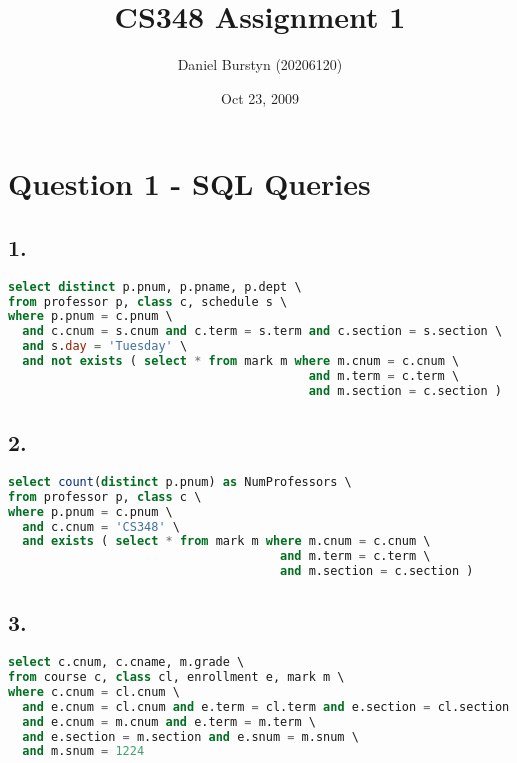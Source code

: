 \documentclass[12pt]{article}
\title{CS348 Assignment 1}
\author{Daniel Burstyn (20206120)}
\date{Oct 23, 2009}
\begin{document}
\maketitle
\section*{Question 1 - SQL Queries}
\subsection*{1.}

\begin{lstlisting}[language=sql]
select distinct p.pnum, p.pname, p.dept \
from professor p, class c, schedule s \
where p.pnum = c.pnum \
  and c.cnum = s.cnum and c.term = s.term and c.section = s.section \
  and s.day = 'Tuesday' \
  and not exists ( select * from mark m where m.cnum = c.cnum \
                                          and m.term = c.term \
                                          and m.section = c.section )
\end{lstlisting}
\vspace{1em}
\subsection*{2.}

\begin{lstlisting}[language=sql]
select count(distinct p.pnum) as NumProfessors \
from professor p, class c \
where p.pnum = c.pnum \
  and c.cnum = 'CS348' \
  and exists ( select * from mark m where m.cnum = c.cnum \
                                      and m.term = c.term \
                                      and m.section = c.section )
\end{lstlisting}
\vspace{1em}
\subsection*{3.}

\begin{lstlisting}[language=sql]
select c.cnum, c.cname, m.grade \
from course c, class cl, enrollment e, mark m \
where c.cnum = cl.cnum \
  and e.cnum = cl.cnum and e.term = cl.term and e.section = cl.section \
  and e.cnum = m.cnum and e.term = m.term \
  and e.section = m.section and e.snum = m.snum \
  and m.snum = 1224
\end{lstlisting}
\vspace{1em}
\pagebreak    %
\end{document}
